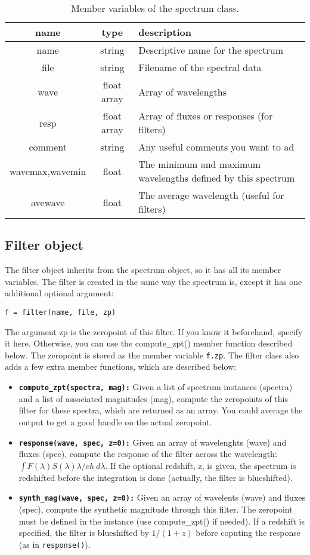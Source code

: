 \documentclass[12pt]{article}
\providecommand{\tabularnewline}{\\}
\begin{document}
%
\begin{table}
\begin{tabular}{|c|c|>{\centering}p{4in}|}
\hline 
name&
type&
description\tabularnewline
\hline
\hline 
name&
string&
Descriptive name for the spectrum\tabularnewline
\hline 
file&
string&
Filename of the spectral data\tabularnewline
\hline 
wave&
float array&
Array of wavelengths\tabularnewline
\hline 
resp&
float array&
Array of fluxes or responses (for filters)\tabularnewline
\hline 
comment&
string&
Any useful comments you want to ad\tabularnewline
\hline 
wavemax,wavemin&
float&
The minimum and maximum wavelengths defined by this spectrum\tabularnewline
\hline 
avewave&
float&
The average wavelength (useful for filters)\tabularnewline
\hline
\end{tabular}


\caption{Member variables of the spectrum class.}
\end{table}



\subsection{Filter object}

The filter object inherits from the spectrum object, so it has all
its member variables. The filter is created in the same way the spectrum
is, except it has one additional optional argument:

\begin{verbatim}
f = filter(name, file, zp)
\end{verbatim}


The argument zp is the zeropoint of this filter. If you know it beforehand,
specify it here. Otherwise, you can use the compute\_zpt() member
function described below. The zeropoint is stored as the member variable
\texttt{f.zp}. The filter class also adds a few extra member functions,
which are described below:

\begin{itemize}
\item \texttt{\textbf{compute\_zpt(spectra, mag):}} Given a list of spectrum
instances (spectra) and a list of associated magnitudes (mag), compute
the zeropoints of this filter for these spectra, which are returned
as an array. You could average the output to get a good handle on
the actual zeropoint.
\item \texttt{\textbf{response(wave, spec, z=0):}} Given an array of wavelenghts
(wave) and fluxes (spec), compute the response of the filter across
the wavelength: $\int F(\lambda)S(\lambda)\lambda/ch\: d\lambda$.
If the optional redshift, z, is given, the spectrum is redshifted
before the integration is done (actually, the filter is blueshifted).
\item \texttt{\textbf{synth\_mag(wave, spec, z=0):}} Given an array of wavelents
(wave) and fluxes (spec), compute the synthetic magnitude through
this filter. The zeropoint must be defined in the instance (use compute\_zpt()
if needed). If a redshift is specified, the filter is blueshifted
by $1/(1+z)$ before coputing the response (as in \texttt{response()}).
\end{itemize}
\end{document}
